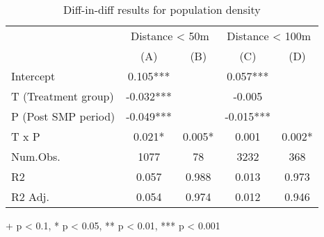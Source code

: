 \begin{table}[h]
\caption{Diff-in-diff results for population density} 
\centering
\fontsize{10.0pt}{12pt}\selectfont
\begin{tabular*}{.8\linewidth}{@{\extracolsep{\fill}}lcccc}
\toprule
 & \multicolumn{2}{c}{Distance < 50m} & \multicolumn{2}{c}{Distance < 100m} \\ 
\cmidrule(lr){2-3} \cmidrule(lr){4-5}
  & (A) & (B) & (C) & (D) \\ 
\midrule\addlinespace[2.5pt]
Intercept & 0.105*** &  & 0.057*** &  \\ 
T (Treatment group) & -0.032*** &  & -0.005 &  \\ 
P (Post SMP period) & -0.049*** &  & -0.015*** &  \\ 
{T x P} & {0.021*} & {0.005*} & {0.001} & {0.002*} \\ 
\midrule
Num.Obs. & 1077 & 78 & 3232 & 368 \\ 
R2 & 0.057 & 0.988 & 0.013 & 0.973 \\ 
R2 Adj. & 0.054 & 0.974 & 0.012 & 0.946 \\ 
\bottomrule
\end{tabular*}
\label{tab:did-censo}
\begin{minipage}{.8\linewidth}
+ p < 0.1, * p < 0.05, ** p < 0.01, *** p < 0.001\\
\end{minipage}
\end{table}

